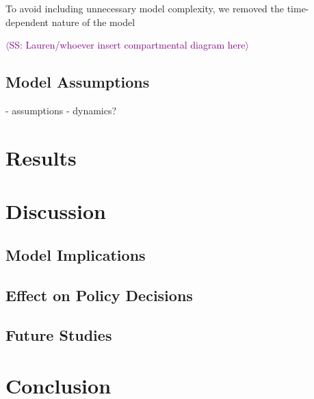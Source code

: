 \documentclass[12pt, centerh1]{article}
\newcommand{\sophie}[1]{{\textcolor{purple}{$\langle$SS: #1$\rangle$}}}
\begin{document}
To avoid including unnecessary model complexity, we removed the time-dependent nature of the model 

\sophie{Lauren/whoever insert compartmental diagram here}

\subsection{Model Assumptions}
- assumptions
- dynamics?

\subsection{}


\section{Results}



\section{Discussion}

\subsection{Model Implications}

\subsection{Effect on Policy Decisions}

\subsection{Future Studies}


\section{Conclusion}

\newpage

\end{document}
